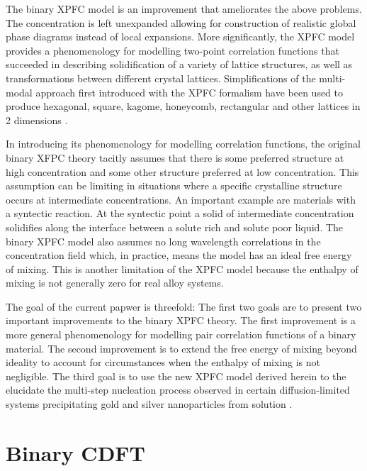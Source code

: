 \documentclass[showkeys, prb, reprint]{revtex4-1}
\begin{document}
The binary XPFC model is an improvement that ameliorates the above problems. The
concentration is left unexpanded allowing for construction of realistic global
phase diagrams instead of local expansions. More significantly, the XPFC model
provides a phenomenology for modelling two-point correlation functions that
succeeded in describing solidification of a variety of lattice structures, as
well as transformations between different crystal lattices. Simplifications of
the multi-modal approach first introduced with the XPFC formalism have been used to produce hexagonal, square, kagome, honeycomb, rectangular and other lattices in 2 dimensions \cite{MKHONTA13}.


In introducing its phenomenology for modelling correlation functions, the original
binary XFPC theory tacitly assumes that there is some preferred structure at
high concentration and some other structure preferred at low concentration.
This assumption can be limiting in situations where a specific crystalline
structure occurs at intermediate concentrations. An important example are 
materials with a syntectic reaction. At the syntectic point a solid of intermediate 
concentration solidifies along the interface between a solute rich and solute poor liquid.
The binary XPFC model also assumes no long wavelength correlations in the
concentration field which, in practice, means the model has an ideal free
energy of mixing.  This is another limitation of the XPFC model because the
enthalpy of mixing is not generally zero for real alloy systems.


The goal of the current papwer is threefold: The first two goals are to
present two important improvements to the binary XPFC theory. The first
improvement is a more general phenomenology for modelling pair correlation
functions of a binary material. The second improvement is to extend the free
energy of mixing beyond ideality to account for circumstances when the enthalpy of
mixing is not negligible. The third goal is to use the new XPFC model derived
herein to the elucidate the multi-step nucleation process observed in certain diffusion-limited systems precipitating gold and silver nanoparticles from solution \cite{LOH17}. 

\section{Binary CDFT} %
\end{document}
